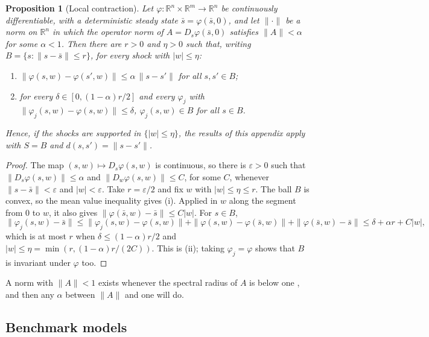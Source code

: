 \documentclass[11pt]{article}
\newtheorem{proposition}[theorem]{Proposition}
\theoremstyle{definition}
\theoremstyle{remark}
\newcommand{\R}{\mathbb{R}}
\begin{document}
\begin{proposition}[Local contraction]\label{prop:local}
Let $\varphi : \R^n \times \R^m \to \R^n$ be continuously differentiable, with a deterministic
steady state $\bar s = \varphi(\bar s, 0)$, and let $\|\cdot\|$ be a norm on $\R^n$ in which the
operator norm of $A = D_s\varphi(\bar s, 0)$ satisfies $\|A\| < \alpha$ for some $\alpha < 1$.
Then there are $r > 0$ and $\eta > 0$ such that, writing $B = \{s : \|s - \bar s\| \le r\}$, for
every shock with $|w| \le \eta$:
\begin{enumerate}[label=(\roman*),leftmargin=2em]
\item $\|\varphi(s,w) - \varphi(s',w)\| \le \alpha\,\|s - s'\|$ for all $s, s' \in B$;
\item for every $\delta \in [0, (1-\alpha)r/2]$ and every $\varphi_j$ with
$\|\varphi_j(s,w) - \varphi(s,w)\| \le \delta$, $\varphi_j(s,w) \in B$ for all $s \in B$.
\end{enumerate}
Hence, if the shocks are supported in $\{|w| \le \eta\}$, the results of this appendix apply with
$S = B$ and $d(s,s') = \|s - s'\|$.
\end{proposition}

\begin{proof}
The map $(s,w) \mapsto D_s\varphi(s,w)$ is continuous, so there is $\varepsilon > 0$ such that
$\|D_s\varphi(s,w)\| \le \alpha$ and $\|D_w\varphi(s,w)\| \le C$, for some $C$, whenever
$\|s - \bar s\| < \varepsilon$ and $|w| < \varepsilon$. Take $r = \varepsilon/2$ and fix $w$ with
$|w| \le \eta \le r$. The ball $B$ is convex, so the mean value inequality gives (i). Applied in
$w$ along the segment from $0$ to $w$, it also gives $\|\varphi(\bar s, w) - \bar s\| \le C|w|$.
For $s \in B$,
\[
  \|\varphi_j(s,w) - \bar s\| \le \|\varphi_j(s,w) - \varphi(s,w)\| + \|\varphi(s,w) -
  \varphi(\bar s, w)\| + \|\varphi(\bar s,w) - \bar s\| \le \delta + \alpha r + C|w| ,
\]
which is at most $r$ when $\delta \le (1-\alpha)r/2$ and $|w| \le \eta = \min(r, (1-\alpha)r/(2C))$.
This is (ii); taking $\varphi_j = \varphi$ shows that $B$ is invariant under $\varphi$ too.
\end{proof}

\noindent A norm with $\|A\| < 1$ exists whenever the spectral radius of $A$ is below one
\citep[Lemma 5.6.10]{HornJohnson2013}, and then any $\alpha$ between $\|A\|$ and one will do.

\subsection{Benchmark models}
\end{document}
